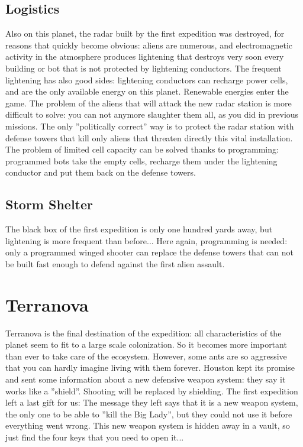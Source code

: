 \subsection{Logistics}

Also on this planet, the radar built by the first expedition was destroyed, for reasons that quickly become obvious: aliens are numerous, and electromagnetic activity in the atmosphere produces lightening that destroys very soon every building or bot that is not protected by lightening conductors. The frequent lightening has also good sides: lightening conductors can recharge power cells, and are the only available energy on this planet. Renewable energies enter the game. The problem of the aliens that will attack the new radar station is more difficult to solve: you can not anymore slaughter them all, as you did in previous missions. The only ''politically correct'' way is to protect the radar station with defense towers that kill only aliens that threaten directly this vital installation. The problem of limited cell capacity can be solved thanks to programming: programmed bots take the empty cells, recharge them under the lightening conductor and put them back on the defense towers.


\subsection{Storm Shelter}

The black box of the first expedition is only one hundred yards away, but lightening is more frequent than before... Here again, programming is needed: only a programmed winged shooter can replace the defense towers that can not be built fast enough to defend against the first alien assault.


\section{Terranova}

Terranova is the final destination of the expedition: all characteristics of the planet seem to fit to a large scale colonization. So it becomes more important than ever to take care of the ecosystem. However, some ants are so aggressive that you can hardly imagine living with them forever. Houston kept its promise and sent some information about a new defensive weapon system: they say it works like a ''shield''. Shooting will be replaced by shielding. The first expedition left a last gift for us: The message they left says that it is a new weapon system, the only one to be able to ''kill the Big Lady'', but they could not use it before everything went wrong. This new weapon system is hidden away in a vault, so just find the four keys that you need to open it...


